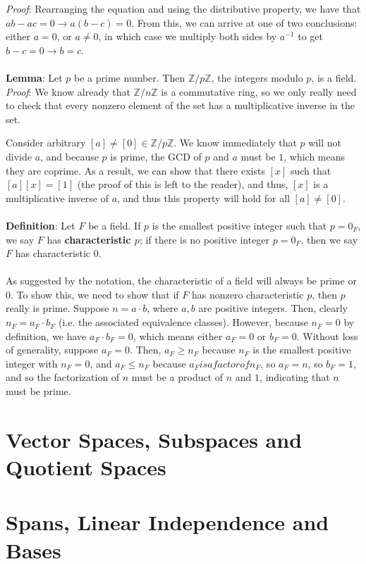 \documentclass[11pt]{report}
\newcommand{\Z}{\mathbb{Z}}
\begin{document}
\textit{Proof}: Rearranging the equation and using the distributive property, we have that $ab - ac = 0 \rightarrow a(b-c) = 0$. From this, we can arrive at one of two conclusions: either $a = 0$, or $a \ne 0$, in which case we multiply both sides by $a^{-1}$ to get $b - c = 0 \rightarrow b = c$.
\\ \\
\textbf{Lemma}: Let $p$ be a prime number. Then $\Z/p\Z$, the integers modulo $p$, is a field. \\
\textit{Proof}: We know already that $\Z/n\Z$ is a commutative ring, so we only really need to check that every nonzero element of the set has a multiplicative inverse in the set. 

Consider arbitrary $[a] \ne [0] \in \Z/p\Z$. We know immediately that $p$ will not divide $a$, and because $p$ is prime, the GCD of $p$ and $a$ must be $1$, which means they are coprime. As a result, we can show that there exists $[x]$ such that $[a][x] = [1]$ (the proof of this is left to the reader), and thus, $[x]$ is a multiplicative inverse of $a$, and thus this property will hold for all $[a] \ne [0]$.
\\ \\
\textbf{Definition}: Let $F$ be a field. If $p$ is the smallest positive integer such that $p = 0_F$, we say $F$ has \textbf{characteristic $p$}; if there is no positive integer $p = 0_F$, then we say $F$ has characteristic $0$.
\\ \\
As suggested by the notation, the characteristic of a field will always be prime or $0$. To show this, we need to show that if $F$ has nonzero characteristic $p$, then $p$ really is prime. Suppose $n = a \cdot b$, where $a,b$ are positive integers. Then, clearly $n_F = a_F \cdot b_F$ (i.e. the associated equivalence classes). However, because $n_F = 0$ by definition, we have $a_F \cdot b_F = 0$, which means either $a_F = 0$ or $b_F = 0$. Without loss of generality, suppose $a_F = 0$. Then, $a_F \ge n_F$ because $n_F$ is the smallest positive integer with $n_F = 0$, and $a_F \le n_F$ because $a_F is a factor of n_F$, so $a_F = n$, so $b_F = 1$, and so the factorization of $n$ must be a product of $n$ and $1$, indicating that $n$ must be prime.
\chapter{Vector Spaces, Subspaces and Quotient Spaces}


\chapter{Spans, Linear Independence and Bases}
\end{document}
